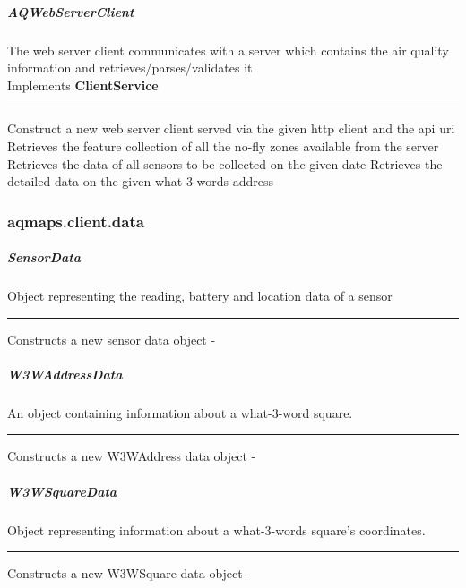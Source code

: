\documentclass[10pt,a4paper]{article}
\newenvironment{mitem}{%
  \multienumerate\renewcommand{\labelname}{\textbullet}%
}{%
  \endmultienumerate%
}
\begin{document}
\subparagraph{AQWebServerClient} The web server client communicates with a server which contains the air quality information and retrieves/parses/validates it
\\

Implements \textbf{ClientService}
\hrule

\begin{mitem}
    \scriptsize
    {Construct a new web server client served via the given http client and the api uri}
    {Retrieves the feature collection of all the no-fly zones available from the server}
    {Retrieves the data of all sensors to be collected on the given date}
    {Retrieves the detailed data on the given what-3-words address}
\end{mitem}


\subsubsection{aqmaps.client.data}
\label{sec:aqmaps.client.data}

\subparagraph{SensorData} Object representing the reading, battery and location data of a sensor
\hrule

\begin{mitem}
    \scriptsize
    {Constructs a new sensor data object}
    {-}
\end{mitem}

\subparagraph{W3WAddressData} An object containing information about a what-3-word square.
\hrule

\begin{mitem}
    \scriptsize
    {Constructs a new W3WAddress data object}
    {-}
\end{mitem}

\subparagraph{W3WSquareData} Object representing information about a what-3-words square's coordinates.
\hrule

\begin{mitem}
    \scriptsize
    {Constructs a new W3WSquare data object}
    {-}
\end{mitem}
\end{document}
